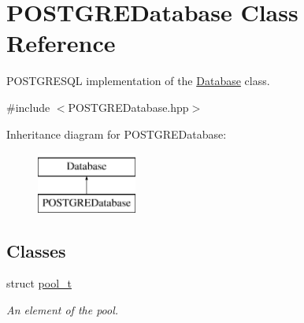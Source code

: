 \hypertarget{classPOSTGREDatabase}{
\section{POSTGREDatabase Class Reference}
\label{classPOSTGREDatabase}
}


POSTGRESQL implementation of the \hyperlink{classDatabase}{Database} class.  




{\ttfamily \#include $<$POSTGREDatabase.hpp$>$}

Inheritance diagram for POSTGREDatabase:\begin{figure}[H]
\begin{center}
\leavevmode
\includegraphics[height=2.000000cm]{classPOSTGREDatabase}
\end{center}
\end{figure}
\subsection*{Classes}
\begin{DoxyCompactItemize}
\item 
struct \hyperlink{structPOSTGREDatabase_1_1pool__t}{pool\_\-t}
\begin{DoxyCompactList}\small\item\em An element of the pool. \item\end{DoxyCompactList}\end{DoxyCompactItemize}
